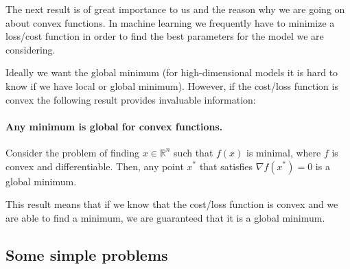\documentclass[%
oneside,                 %
final,                   %
10pt]{article}
\begin{document}
The next result is of great importance to us and the reason why we are
going on about convex functions. In machine learning we frequently
have to minimize a loss/cost function in order to find the best
parameters for the model we are considering. 

Ideally we want the
global minimum (for high-dimensional models it is hard to know
if we have local or global minimum). However, if the cost/loss function
is convex the following result provides invaluable information:


\paragraph{Any minimum is global for convex functions.}
Consider the problem of finding $x \in \mathbb{R}^n$ such that $f(x)$
is minimal, where $f$ is convex and differentiable. Then, any point
$x^*$ that satisfies $\nabla f(x^*) = 0$ is a global minimum.



This result means that if we know that the cost/loss function is convex and we are able to find a minimum, we are guaranteed that it is a global minimum.

\subsection{Some simple problems}
\end{document}

